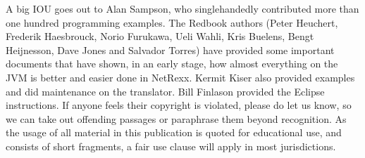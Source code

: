 A big IOU goes out to Alan Sampson, who singlehandedly contributed more than one hundred \nr{} programming examples. The Redbook authors (Peter Heuchert, Frederik Haesbrouck, Norio Furukawa, Ueli Wahli, Kris Buelens, Bengt Heijnesson, Dave Jones and Salvador Torres) have provided some important documents that have shown, in an early stage, how almost everything on the JVM is better and easier done in NetRexx. Kermit Kiser also provided examples and did maintenance on the translator. Bill Finlason provided the Eclipse instructions. If anyone feels their copyright is violated, please do let us know, so we can take out offending passages or paraphrase them beyond recognition. As the usage of all material in this publication is quoted for educational use, and consists of short fragments, a fair use clause will apply in most jurisdictions.

